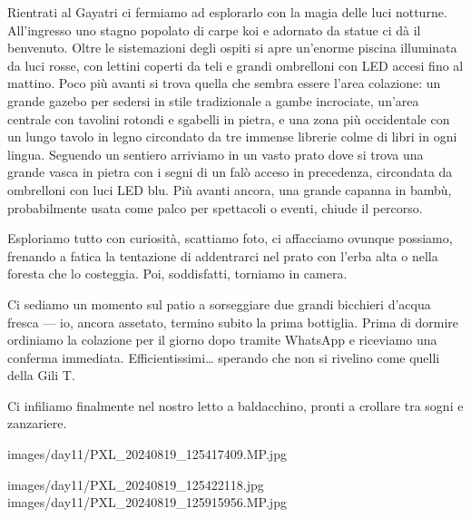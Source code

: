 Rientrati al Gayatri ci fermiamo ad esplorarlo con la magia delle luci notturne. All'ingresso uno stagno popolato di carpe koi e adornato da statue ci dà il benvenuto. Oltre le sistemazioni degli ospiti si apre un'enorme piscina illuminata da luci rosse, con lettini coperti da teli e grandi ombrelloni con LED accesi fino al mattino. Poco più avanti si trova quella che sembra essere l'area colazione: un grande gazebo per sedersi in stile tradizionale a gambe incrociate, un'area centrale con tavolini rotondi e sgabelli in pietra, e una zona più occidentale con un lungo tavolo in legno circondato da tre immense librerie colme di libri in ogni lingua. Seguendo un sentiero arriviamo in un vasto prato dove si trova una grande vasca in pietra con i segni di un falò acceso in precedenza, circondata da ombrelloni con luci LED blu. Più avanti ancora, una grande capanna in bambù, probabilmente usata come palco per spettacoli o eventi, chiude il percorso.

Esploriamo tutto con curiosità, scattiamo foto, ci affacciamo ovunque possiamo, frenando a fatica la tentazione di addentrarci nel prato con l'erba alta o nella foresta che lo costeggia. Poi, soddisfatti, torniamo in camera.

Ci sediamo un momento sul patio a sorseggiare due grandi bicchieri d'acqua fresca — io, ancora assetato, termino subito la prima bottiglia. Prima di dormire ordiniamo la colazione per il giorno dopo tramite WhatsApp e riceviamo una conferma immediata. Efficientissimi… sperando che non si rivelino come quelli della Gili T.

Ci infiliamo finalmente nel nostro letto a baldacchino, pronti a crollare tra sogni e zanzariere.

\pagestyle{empty} %

%

%

                      {images/day11/PXL_20240819_125417409.MP.jpg}
%

                      {images/day11/PXL_20240819_125422118.jpg}
                      {images/day11/PXL_20240819_125915956.MP.jpg}
%

